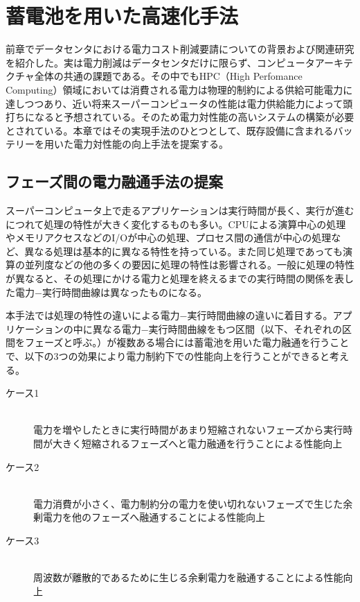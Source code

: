 \chapter{蓄電池を用いた高速化手法}
\label{chap:proposal}

前章でデータセンタにおける電力コスト削減要請についての背景および関連研究を紹介した。実は電力削減はデータセンタだけに限らず、コンピュータアーキテクチャ全体の共通の課題である。その中でもHPC（High Perfomance Computing）領域においては消費される電力は物理的制約による供給可能電力に達しつつあり、近い将来スーパーコンピュータの性能は電力供給能力によって頭打ちになると予想されている。そのため電力対性能の高いシステムの構築が必要とされている。本章ではその実現手法のひとつとして、既存設備に含まれるバッテリーを用いた電力対性能の向上手法を提案する。


\section{フェーズ間の電力融通手法の提案}
\label{sec:curb}

スーパーコンピュータ上で走るアプリケーションは実行時間が長く、実行が進むにつれて処理の特性が大きく変化するものも多い。CPUによる演算中心の処理やメモリアクセスなどのI/Oが中心の処理、プロセス間の通信が中心の処理など、異なる処理は基本的に異なる特性を持っている。また同じ処理であっても演算の並列度などの他の多くの要因に処理の特性は影響される。一般に処理の特性が異なると、その処理にかける電力と処理を終えるまでの実行時間の関係を表した電力−実行時間曲線は異なったものになる。

本手法では処理の特性の違いによる電力−実行時間曲線の違いに着目する。アプリケーションの中に異なる電力−実行時間曲線をもつ区間（以下、それぞれの区間をフェーズと呼ぶ。）が複数ある場合には蓄電池を用いた電力融通を行うことで、以下の3つの効果により電力制約下での性能向上を行うことができると考える。

\begin{description}
\item[ケース1] \mbox{} \\電力を増やしたときに実行時間があまり短縮されないフェーズから実行時間が大きく短縮されるフェーズへと電力融通を行うことによる性能向上
\item[ケース2] \mbox{} \\電力消費が小さく、電力制約分の電力を使い切れないフェーズで生じた余剰電力を他のフェーズへ融通することによる性能向上
\item[ケース3] \mbox{} \\周波数が離散的であるために生じる余剰電力を融通することによる性能向上
\end{description}


